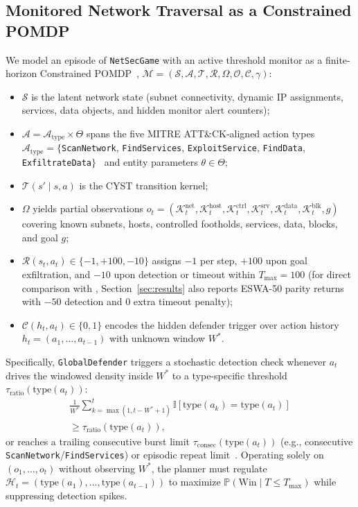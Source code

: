 \documentclass[a4paper,fleqn]{cas-dc}
\begin{document}
\subsection{Monitored Network Traversal as a Constrained POMDP}
We model an episode of \texttt{NetSecGame} with an active threshold monitor as a finite-horizon Constrained POMDP~\citep{altman1999cmdp,kaelbling1998pomdp}, $\mathcal{M} = (\mathcal{S}, \mathcal{A}, \mathcal{T}, \mathcal{R}, \Omega, \mathcal{O}, \mathcal{C}, \gamma)$:
\begin{itemize}
    \item $\mathcal{S}$ is the latent network state (subnet connectivity, dynamic IP assignments, services, data objects, and hidden monitor alert counters);
    \item $\mathcal{A} = \mathcal{A}_{\text{type}} \times \Theta$ spans the five MITRE ATT\&CK-aligned action types $\mathcal{A}_{\text{type}} = \{$\texttt{ScanNetwork}, \texttt{FindServices}, \texttt{ExploitService}, \texttt{FindData}, \texttt{ExfiltrateData}$\}$~\citep{mitre2024attack} and entity parameters $\theta \in \Theta$;
    \item $\mathcal{T}(s' \mid s, a)$ is the CYST transition kernel;
    \item $\Omega$ yields partial observations $o_t = (\mathcal{K}^{\text{net}}_t, \mathcal{K}^{\text{host}}_t, \mathcal{K}^{\text{ctrl}}_t, \mathcal{K}^{\text{srv}}_t, \mathcal{K}^{\text{data}}_t, \mathcal{K}^{\text{blk}}_t, g)$ covering known subnets, hosts, controlled footholds, services, data, blocks, and goal $g$;
    \item $\mathcal{R}(s_t, a_t) \in \{-1, +100, -10\}$ assigns $-1$ per step, $+100$ upon goal exfiltration, and $-10$ upon detection or timeout within $T_{\max} = 100$ (for direct comparison with \citet{rigaki2026building}, Section~\ref{sec:results} also reports ESWA-50 parity returns with $-50$ detection and $0$ extra timeout penalty);
    \item $\mathcal{C}(h_t, a_t) \in \{0, 1\}$ encodes the hidden defender trigger over action history $h_t = (a_1, \dots, a_{t-1})$ with unknown window $W^*$.
\end{itemize}

Specifically, \texttt{GlobalDefender} triggers a stochastic detection check whenever $a_t$ drives the windowed density inside $W^*$ to a type-specific threshold $\tau_{\text{ratio}}(\text{type}(a_t))$:
\begin{multline}
    \frac{1}{W^*} \sum_{k=\max(1, t-W^*+1)}^{t} \mathbb{I}[\mathrm{type}(a_k) = \mathrm{type}(a_t)] \\
    \ge \tau_{\mathrm{ratio}}(\mathrm{type}(a_t)),
    \label{eq:defender_density}
\end{multline}
or reaches a trailing consecutive burst limit $\tau_{\text{consec}}(\text{type}(a_t))$ (e.g., consecutive \texttt{ScanNetwork}/\texttt{FindServices}) or episodic repeat limit~\citep{rigaki2026building}. Operating solely on $(o_1, \dots, o_t)$ without observing $W^*$, the planner must regulate $\mathcal{H}_t = (\text{type}(a_1), \dots, \text{type}(a_{t-1}))$ to maximize $\mathbb{P}(\text{Win} \mid T \le T_{\max})$ while suppressing detection spikes.
\end{document}
